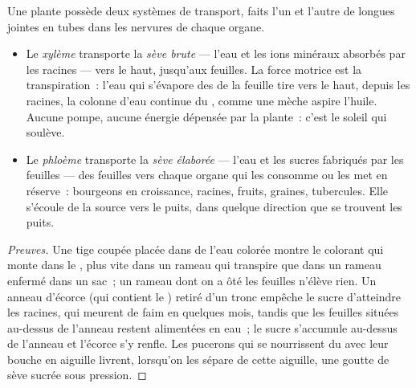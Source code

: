 \begin{proposition}\label{prop:g12:plant-rooted-life:saps}
Une plante possède deux systèmes de transport, faits l'un et l'autre
de longues  jointes en tubes dans les nervures de chaque
organe.
\begin{itemize}
  \item Le \emph{xylème} transporte la \emph{sève
        brute} --- l'eau et les ions minéraux absorbés par les
        racines --- vers le haut, jusqu'aux feuilles. La force motrice
        est la transpiration~: l'eau qui s'évapore des  de la
        feuille tire vers le haut, depuis les racines, la colonne
        d'eau continue du , comme une mèche aspire l'huile.
        Aucune pompe, aucune énergie dépensée par la plante~: c'est le
        soleil qui soulève.
  \item Le \emph{phloème} transporte la \emph{sève
        élaborée} --- l'eau et les sucres fabriqués par les
        feuilles --- des feuilles vers chaque organe qui les consomme
        ou les met en réserve~: bourgeons en croissance, racines,
        fruits, graines, tubercules. Elle s'écoule de la source vers
        le puits, dans quelque direction que se trouvent les puits.
\end{itemize}
\end{proposition}
\begin{proof}[Preuves]
Une tige coupée placée dans de l'eau colorée montre le colorant qui
monte dans le , plus vite dans un rameau qui transpire que dans
un rameau enfermé dans un sac~; un rameau dont on a ôté les feuilles
n'élève rien. Un anneau d'écorce (qui contient le ) retiré d'un
tronc empêche le sucre d'atteindre les racines, qui meurent de faim en
quelques mois, tandis que les feuilles situées au-dessus de l'anneau
restent alimentées en eau~; le sucre s'accumule au-dessus de l'anneau
et l'écorce s'y renfle. Les pucerons qui se nourrissent du 
avec leur bouche en aiguille livrent, lorsqu'on les sépare de cette
aiguille, une goutte de sève sucrée sous pression.
\end{proof}

